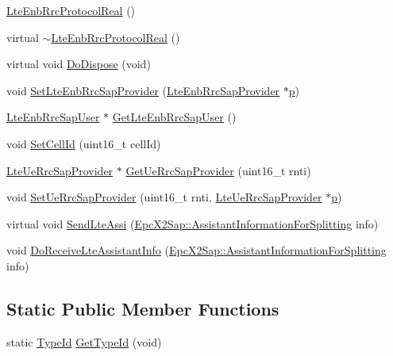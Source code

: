 \begin{DoxyCompactItemize}
\item 
\hyperlink{classns3_1_1LteEnbRrcProtocolReal_a48af83bc6a5f85b729d70b649e504b7c}{Lte\+Enb\+Rrc\+Protocol\+Real} ()
\item 
virtual \hyperlink{classns3_1_1LteEnbRrcProtocolReal_a2d4be332a3d0520ed14e3017f2d447ab}{$\sim$\+Lte\+Enb\+Rrc\+Protocol\+Real} ()
\item 
virtual void \hyperlink{classns3_1_1LteEnbRrcProtocolReal_adfe67fe402cfe8216110a0d27e9e031f}{Do\+Dispose} (void)
\item 
void \hyperlink{classns3_1_1LteEnbRrcProtocolReal_ab9cfe6e7099c6cd7bb5cf7cf63df3610}{Set\+Lte\+Enb\+Rrc\+Sap\+Provider} (\hyperlink{classns3_1_1LteEnbRrcSapProvider}{Lte\+Enb\+Rrc\+Sap\+Provider} $\ast$\hyperlink{lte__link__budget__x2__handover__measures_8m_ac9de518908a968428863f829398a4e62}{p})
\item 
\hyperlink{classns3_1_1LteEnbRrcSapUser}{Lte\+Enb\+Rrc\+Sap\+User} $\ast$ \hyperlink{classns3_1_1LteEnbRrcProtocolReal_a98ce6b1b67a13fb0bcb81ad3692d49c0}{Get\+Lte\+Enb\+Rrc\+Sap\+User} ()
\item 
void \hyperlink{classns3_1_1LteEnbRrcProtocolReal_a5753aff95cc778d8713817755c30adb5}{Set\+Cell\+Id} (uint16\+\_\+t cell\+Id)
\item 
\hyperlink{classns3_1_1LteUeRrcSapProvider}{Lte\+Ue\+Rrc\+Sap\+Provider} $\ast$ \hyperlink{classns3_1_1LteEnbRrcProtocolReal_a4aecf1be7936feac7bae8a86b4103dea}{Get\+Ue\+Rrc\+Sap\+Provider} (uint16\+\_\+t rnti)
\item 
void \hyperlink{classns3_1_1LteEnbRrcProtocolReal_ae9f2435d5fe26ce44789a4feba5cb5eb}{Set\+Ue\+Rrc\+Sap\+Provider} (uint16\+\_\+t rnti, \hyperlink{classns3_1_1LteUeRrcSapProvider}{Lte\+Ue\+Rrc\+Sap\+Provider} $\ast$\hyperlink{lte__link__budget__x2__handover__measures_8m_ac9de518908a968428863f829398a4e62}{p})
\item 
virtual void \hyperlink{classns3_1_1LteEnbRrcProtocolReal_af3f0713d5ae2d03e109ea923119c81b8}{Send\+Lte\+Assi} (\hyperlink{structns3_1_1EpcX2Sap_1_1AssistantInformationForSplitting}{Epc\+X2\+Sap\+::\+Assistant\+Information\+For\+Splitting} info)
\item 
void \hyperlink{classns3_1_1LteEnbRrcProtocolReal_a8e6391370c997d8a69bb80d9c977f588}{Do\+Receive\+Lte\+Assistant\+Info} (\hyperlink{structns3_1_1EpcX2Sap_1_1AssistantInformationForSplitting}{Epc\+X2\+Sap\+::\+Assistant\+Information\+For\+Splitting} info)
\end{DoxyCompactItemize}
\subsection*{Static Public Member Functions}
\begin{DoxyCompactItemize}
\item 
static \hyperlink{classns3_1_1TypeId}{Type\+Id} \hyperlink{classns3_1_1LteEnbRrcProtocolReal_aa5098e94ad23c0ae92e580f33b3f44be}{Get\+Type\+Id} (void)
\end{DoxyCompactItemize}
